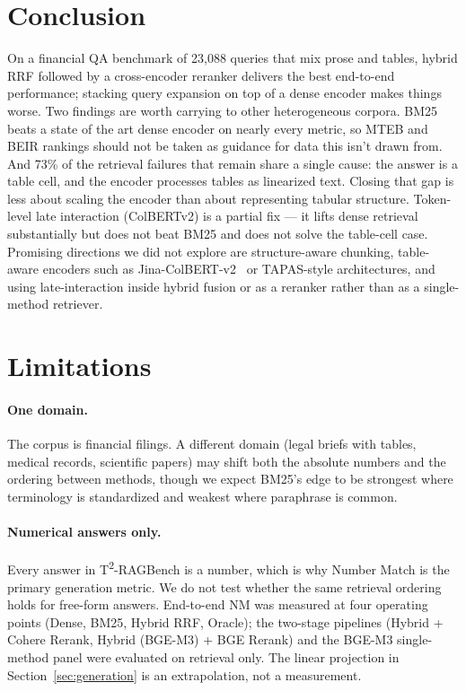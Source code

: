 \documentclass{article}
\begin{document}
\section{Conclusion}
\label{sec:conclusion}

On a financial QA benchmark of 23{,}088 queries that mix prose and tables, hybrid RRF followed by a cross-encoder reranker delivers the best end-to-end performance; stacking query expansion on top of a dense encoder makes things worse. Two findings are worth carrying to other heterogeneous corpora. BM25 beats a state of the art dense encoder on nearly every metric, so MTEB and BEIR rankings should not be taken as guidance for data this isn't drawn from. And 73\% of the retrieval failures that remain share a single cause: the answer is a table cell, and the encoder processes tables as linearized text. Closing that gap is less about scaling the encoder than about representing tabular structure. Token-level late interaction (ColBERTv2) is a partial fix --- it lifts dense retrieval substantially but does not beat BM25 and does not solve the table-cell case. Promising directions we did not explore are structure-aware chunking, table-aware encoders such as Jina-ColBERT-v2~\citep{sturua2024jinacolbert} or TAPAS-style architectures, and using late-interaction inside hybrid fusion or as a reranker rather than as a single-method retriever.

\section*{Limitations}

\paragraph{One domain.} The corpus is financial filings. A different domain (legal briefs with tables, medical records, scientific papers) may shift both the absolute numbers and the ordering between methods, though we expect BM25's edge to be strongest where terminology is standardized and weakest where paraphrase is common.

\paragraph{Numerical answers only.} Every answer in T\textsuperscript{2}-RAGBench is a number, which is why Number Match is the primary generation metric. We do not test whether the same retrieval ordering holds for free-form answers. End-to-end NM was measured at four operating points (Dense, BM25, Hybrid RRF, Oracle); the two-stage pipelines (Hybrid + Cohere Rerank, Hybrid (BGE-M3) + BGE Rerank) and the BGE-M3 single-method panel were evaluated on retrieval only. The linear projection in Section~\ref{sec:generation} is an extrapolation, not a measurement.
\end{document}
